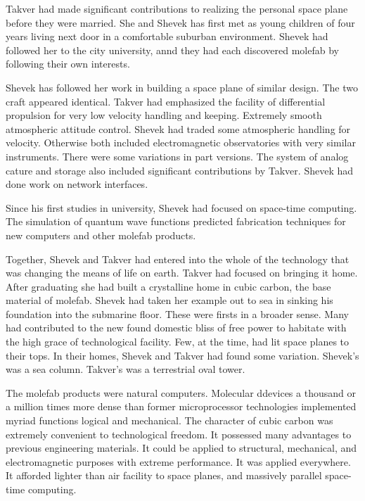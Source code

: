 Takver had made significant contributions to realizing the personal
space plane before they were married.  She and Shevek has first met as
young children of four years living next door in a comfortable
suburban environment.  Shevek had followed her to the city university,
annd they had each discovered molefab by following their own
interests.

Shevek has followed her work in building a space plane of similar
design.  The two craft appeared identical.  Takver had emphasized the
facility of differential propulsion for very low velocity handling and
keeping.  Extremely smooth atmospheric attitude control.  Shevek had
traded some atmospheric handling for velocity.  Otherwise both
included electromagnetic observatories with very similar instruments.
There were some variations in part versions.  The system of analog
cature and storage also included significant contributions by Takver.
Shevek had done work on network interfaces.

Since his first studies in university, Shevek had focused on
space-time computing.  The simulation of quantum wave functions
predicted fabrication techniques for new computers and other molefab
products.  

Together, Shevek and Takver had entered into the whole of the
technology that was changing the means of life on earth.  Takver had
focused on bringing it home.  After graduating she had built a
crystalline home in cubic carbon, the base material of molefab.
Shevek had taken her example out to sea in sinking his foundation into
the submarine floor.  These were firsts in a broader sense.  Many had
contributed to the new found domestic bliss of free power to habitate
with the high grace of technological facility.  Few, at the time, had
lit space planes to their tops.  In their homes, Shevek and Takver had
found some variation.  Shevek's was a sea column.  Takver's was a
terrestrial oval tower.

The molefab products were natural computers.  Molecular ddevices a
thousand or a million times more dense than former microprocessor
technologies implemented myriad functions logical and mechanical.  The
character of cubic carbon was extremely convenient to technological
freedom.  It possessed many advantages to previous engineering
materials.  It could be applied to structural, mechanical, and
electromagnetic purposes with extreme performance.  It was applied
everywhere.  It afforded lighter than air facility to space planes,
and massively parallel space-time computing.

